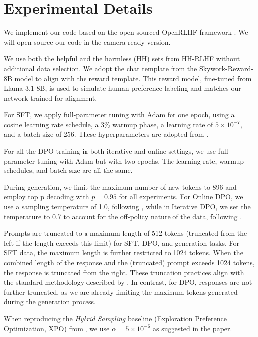 \section{Experimental Details}\label{app:experiment}

We implement our code based on the open-sourced OpenRLHF framework \citet{hu2024openrlhf}. We will open-source our code in the camera-ready version.

We use both the helpful and the harmless (HH) sets from HH-RLHF \citep{bai2022training} without additional data selection. We adopt the chat template from the Skywork-Reward-8B model \citep{liu2024skywork} to align with the reward template. This reward model, fine-tuned from Llama-3.1-8B, is used to simulate human preference labeling and matches our network trained for alignment.

For SFT, we apply full-parameter tuning with Adam for one epoch, using a cosine learning rate schedule, a 3\% warmup phase, a learning rate of $5\times 10^{-7}$, and a batch size of 256. These hyperparameters are adopted from \citet{hu2024openrlhf}. 

For all the DPO training in both iterative and online settings, we use full-parameter tuning with Adam but with two epochs. The learning rate, warmup schedules, and batch size are all the same. 

During generation, we limit the maximum number of new tokens to 896 and employ top$\_$p decoding with $p=0.95$ for all experiments. For Online DPO, we use a sampling temperature of 1.0, following \citet{guo2024direct}, while in Iterative DPO, we set the temperature to 0.7 to account for the off-policy nature of the data, following \citet{dong2024rlhf, shi2024crucial}.

Prompts are truncated to a maximum length of 512 tokens (truncated from the left if the length exceeds this limit) for SFT, DPO, and generation tasks. For SFT data, the maximum length is further restricted to 1024 tokens. When the combined length of the response and the (truncated) prompt exceeds 1024 tokens, the response is truncated from the right. These truncation practices align with the standard methodology described by \citet{rafailov2023direct}. In contrast, for DPO, responses are not further truncated, as we are already limiting the maximum tokens generated during the generation process.

When reproducing the \textit{Hybrid Sampling} baseline (Exploration Preference Optimization, XPO) from \citet{xie2024exploratory}, we use $\alpha=5\times 10^{-6}$ as suggested in the paper.

